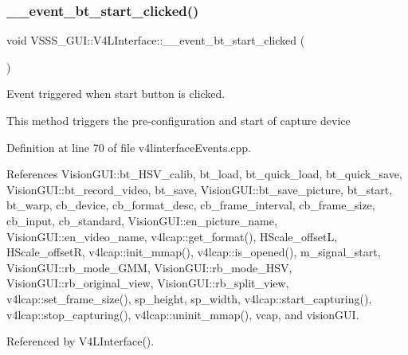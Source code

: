 \subsubsection{\texorpdfstring{\+\_\+\+\_\+event\+\_\+bt\+\_\+start\+\_\+clicked()}{\_\_event\_bt\_start\_clicked()}}
{\footnotesize\ttfamily void V\+S\+S\+S\+\_\+\+G\+U\+I\+::\+V4\+L\+Interface\+::\+\_\+\+\_\+event\+\_\+bt\+\_\+start\+\_\+clicked (\begin{DoxyParamCaption}{ }\end{DoxyParamCaption})}



Event triggered when \textquotesingle{}start\textquotesingle{} button is clicked. 

This method triggers the pre-\/configuration and start of capture device 

Definition at line 70 of file v4linterface\+Events.\+cpp.



References Vision\+G\+U\+I\+::bt\+\_\+\+H\+S\+V\+\_\+calib, bt\+\_\+load, bt\+\_\+quick\+\_\+load, bt\+\_\+quick\+\_\+save, Vision\+G\+U\+I\+::bt\+\_\+record\+\_\+video, bt\+\_\+save, Vision\+G\+U\+I\+::bt\+\_\+save\+\_\+picture, bt\+\_\+start, bt\+\_\+warp, cb\+\_\+device, cb\+\_\+format\+\_\+desc, cb\+\_\+frame\+\_\+interval, cb\+\_\+frame\+\_\+size, cb\+\_\+input, cb\+\_\+standard, Vision\+G\+U\+I\+::en\+\_\+picture\+\_\+name, Vision\+G\+U\+I\+::en\+\_\+video\+\_\+name, v4lcap\+::get\+\_\+format(), H\+Scale\+\_\+offsetL, H\+Scale\+\_\+offsetR, v4lcap\+::init\+\_\+mmap(), v4lcap\+::is\+\_\+opened(), m\+\_\+signal\+\_\+start, Vision\+G\+U\+I\+::rb\+\_\+mode\+\_\+\+G\+MM, Vision\+G\+U\+I\+::rb\+\_\+mode\+\_\+\+H\+SV, Vision\+G\+U\+I\+::rb\+\_\+original\+\_\+view, Vision\+G\+U\+I\+::rb\+\_\+split\+\_\+view, v4lcap\+::set\+\_\+frame\+\_\+size(), sp\+\_\+height, sp\+\_\+width, v4lcap\+::start\+\_\+capturing(), v4lcap\+::stop\+\_\+capturing(), v4lcap\+::uninit\+\_\+mmap(), vcap, and vision\+G\+UI.



Referenced by V4\+L\+Interface().


